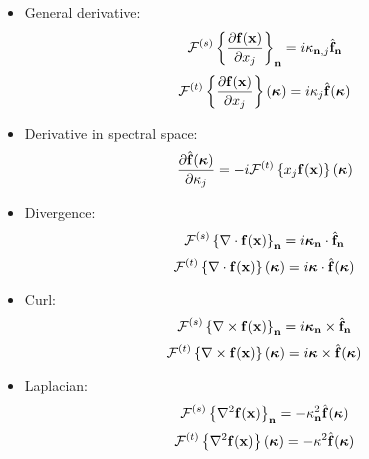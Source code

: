 \documentclass[oneside,a4paper,11pt]{article}
\begin{document}
\begin{itemize}

\item General derivative:
\begin{equation*} 
  \mathcal{F}^{(s)} \left \{ \dfrac{\partial \mathbf{f} (\mathbf{x})}{\partial x_j} \right \}_{\mathbf{n}}  = i \kappa_{\mathbf{n},j} \hat{\mathbf{f}}_{\mathbf{n}}
\end{equation*} 
\begin{equation*} 
  \mathcal{F}^{(t)}\left \{ \dfrac{\partial \mathbf{f} (\mathbf{x})}{\partial x_j} \right \}(\boldsymbol\kappa) = i \kappa_j \hat{\mathbf{f}}(\boldsymbol\kappa)
\end{equation*}

\item Derivative in spectral space:
\begin{equation*}
  \frac{\partial \hat{\mathbf{f}}(\boldsymbol\kappa)}{\partial \kappa_j} = -i \mathcal{F}^{(t)} \left \{ x_j \mathbf{f}(\mathbf{x}) \right \} (\boldsymbol\kappa)
\end{equation*}

\item Divergence:
\begin{equation*}
  \mathcal{F}^{(s)} \left \{ \nabla \cdot \mathbf{f}(\mathbf{x}) \right \}_{\mathbf{n}} = i \boldsymbol\kappa_{\mathbf{n}} \cdot \hat{\mathbf{f}}_{\mathbf{n}}
\end{equation*}
\begin{equation*}
  \mathcal{F}^{(t)} \left \{ \nabla \cdot \mathbf{f}(\mathbf{x}) \right \} (\boldsymbol\kappa) = i \boldsymbol\kappa \cdot \hat{\mathbf{f}}(\boldsymbol\kappa)
\end{equation*}

\item Curl:
\begin{equation*}
  \mathcal{F}^{(s)} \left \{ \nabla \times \mathbf{f}(\mathbf{x}) \right \}_{\mathbf{n}} = i \boldsymbol\kappa_{\mathbf{n}} \times \hat{\mathbf{f}}_{\mathbf{n}}
\end{equation*}
\begin{equation*}
  \mathcal{F}^{(t)} \left \{ \nabla \times \mathbf{f}(\mathbf{x}) \right \} (\boldsymbol\kappa) = i \boldsymbol\kappa \times \hat{\mathbf{f}}(\boldsymbol\kappa)
\end{equation*}

\item Laplacian:
\begin{equation*}
  \mathcal{F}^{(s)} \left \{ \nabla^2 \mathbf{f}(\mathbf{x}) \right \}_{\mathbf{n}} = - \kappa_{\mathbf{n}}^2 \hat{\mathbf{f}}(\boldsymbol\kappa)
\end{equation*}
\begin{equation*}
  \mathcal{F}^{(t)} \left \{ \nabla^2 \mathbf{f}(\mathbf{x}) \right \} (\boldsymbol\kappa) = - \kappa^2 \hat{\mathbf{f}}(\boldsymbol\kappa)
\end{equation*}

\end{itemize}
\end{document}
